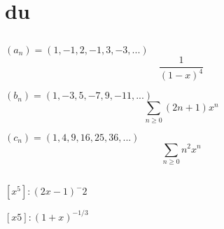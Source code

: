 \documentclass[a4paper]{article}
\begin{document}
\section{du}
\subsection{}

$
(a_n) = (1, -1, 2, -1, 3, -3, ...)
$
$$
\frac{1}{(1-x)^4}
$$

$
(b_n) = (1, -3, 5, -7, 9, -11, ...)
$
$$
\sum_{n \geq 0}(2n + 1)x^n 
$$


$
(c_n) = (1, 4, 9, 16, 25, 36, ...)
$
$$
\sum_{n \geq 0} n^2 x^n 
$$

\subsection{}
$
[x^5] : (2x - 1)^-2
$

$
[x5] : (1 + x)^{-1/3}
$


\subsection{}
\end{document}

